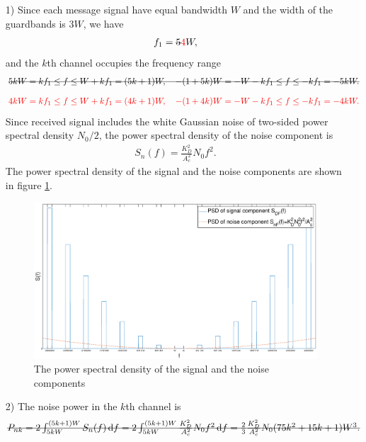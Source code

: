 \documentclass{assignment}
\begin{document}
\begin{sol}
    \begin{itemize}
        \item[1)] Since each message signal have equal bandwidth $W$ and the width of the guardbands is $3W$, we have
        \begin{align}
            f_1=\text{\sout{$5$}}{\color{red}4}W,
        \end{align}
        and the $k$th channel occupies the frequency range
        \begin{align}
            \text{\sout{$5kW=kf_1\leq f\leq W+kf_1=(5k+1)W,\quad-(1+5k)W=-W-kf_1\leq f\leq-kf_1=-5kW.$}}
        \end{align}
        \begin{align}
            \color{red}4kW=kf_1\leq f\leq W+kf_1=(4k+1)W,\quad-(1+4k)W=-W-kf_1\leq f\leq-kf_1=-4kW.
        \end{align}
        Since received signal includes the white Gaussian noise of two-sided power spectral density $N_0/2$, the power spectral density of the noise component is
        \begin{align}
            S_n(f)=\frac{K_D^2}{A_c^2}N_0f^2.
        \end{align}
        The power spectral density of the signal and the noise components are shown in figure \ref{A-6-P-4}.
        \begin{figure}[h]
            \centering
            \includegraphics[width=1\columnwidth]{A-6-P-4.eps}
            \caption{The power spectral density of the signal and the noise components}
            \label{A-6-P-4}
        \end{figure}
        \item[2)] The noise power in the $k$th channel is
        \begin{align}
            \text{\sout{$P_{nk}=2\int_{5kW}^{(5k+1)W}S_n(f)\,\mathrm{d}f=2\int_{5kW}^{(5k+1)W}\frac{K_D^2}{A_c^2}N_0f^2\,\mathrm{d}f=\frac{2}{3}\frac{K_D^2}{A_c^2}N_0(75k^2+15k+1)W^3.$}}

\end{align}
\end{itemize}
\end{sol}
\end{document}
